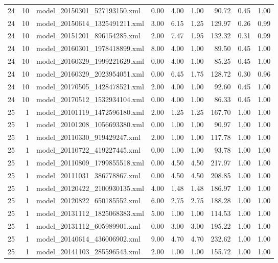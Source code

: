 \begin{table}[ht]
\begin{tabular}{rrlrrrrrr}
   24 &  10 & model\_20150301\_527193150.xml & 0.00 & 4.00 & 1.00 & 90.72 & 0.45 & 1.00 \\ 
   24 &  10 & model\_20150614\_1325491211.xml & 3.00 & 6.15 & 1.25 & 129.97 & 0.26 & 0.99 \\ 
   24 &  10 & model\_20151201\_896154285.xml & 2.00 & 7.47 & 1.95 & 132.32 & 0.31 & 0.99 \\ 
   24 &  10 & model\_20160301\_1978418899.xml & 8.00 & 4.00 & 1.00 & 89.50 & 0.45 & 1.00 \\ 
   24 &  10 & model\_20160329\_1999221629.xml & 0.00 & 4.00 & 1.00 & 85.25 & 0.45 & 1.00 \\ 
   24 &  10 & model\_20160329\_2023954051.xml & 0.00 & 6.45 & 1.75 & 128.72 & 0.30 & 0.96 \\ 
   24 &  10 & model\_20170505\_1428478521.xml & 2.00 & 4.00 & 1.00 & 92.60 & 0.45 & 1.00 \\ 
   24 &  10 & model\_20170512\_1532934104.xml & 0.00 & 4.00 & 1.00 & 86.33 & 0.45 & 1.00 \\ 
   25 &   1 & model\_20101119\_1472596180.xml & 2.00 & 1.25 & 1.25 & 167.70 & 1.00 & 1.00 \\ 
   25 &   1 & model\_20101208\_1056693380.xml & 0.00 & 1.00 & 1.00 & 90.97 & 1.00 & 1.00 \\ 
   25 &   1 & model\_20110330\_919429247.xml & 2.00 & 1.00 & 1.00 & 117.78 & 1.00 & 1.00 \\ 
   25 &   1 & model\_20110722\_419227445.xml & 0.00 & 1.00 & 1.00 & 93.78 & 1.00 & 1.00 \\ 
   25 &   1 & model\_20110809\_1799855518.xml & 0.00 & 4.50 & 4.50 & 217.97 & 1.00 & 1.00 \\ 
   25 &   1 & model\_20111031\_386778867.xml & 0.00 & 4.50 & 4.50 & 208.85 & 1.00 & 1.00 \\ 
   25 &   1 & model\_20120422\_2100930135.xml & 4.00 & 1.48 & 1.48 & 186.97 & 1.00 & 1.00 \\ 
   25 &   1 & model\_20120822\_650185552.xml & 6.00 & 2.75 & 2.75 & 188.28 & 1.00 & 1.00 \\ 
   25 &   1 & model\_20131112\_1825068383.xml & 5.00 & 1.00 & 1.00 & 114.53 & 1.00 & 1.00 \\ 
   25 &   1 & model\_20131112\_605989901.xml & 0.00 & 3.00 & 3.00 & 195.22 & 1.00 & 1.00 \\ 
   25 &   1 & model\_20140614\_436006902.xml & 9.00 & 4.70 & 4.70 & 232.62 & 1.00 & 1.00 \\ 
   25 &   1 & model\_20141103\_285596543.xml & 2.00 & 1.00 & 1.00 & 155.72 & 1.00 & 1.00 \\ 

\end{tabular}
\end{table}

